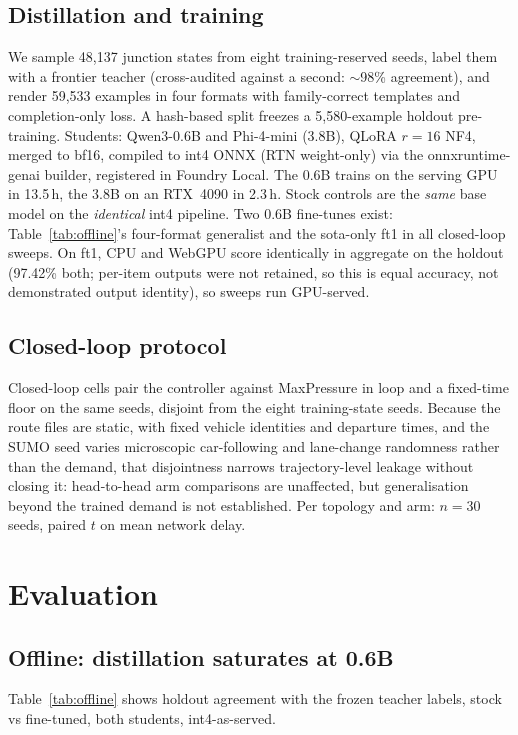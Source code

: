 \documentclass[conference]{IEEEtran}
\begin{document}
\subsection{Distillation and training}
We sample 48{,}137 junction states from eight training-reserved seeds, label
them with a frontier teacher (cross-audited against a second: $\sim$98\%
agreement), and render 59{,}533 examples in four formats with
family-correct templates and completion-only loss. A hash-based split
freezes a 5{,}580-example holdout pre-training. Students: Qwen3-0.6B and
Phi-4-mini (3.8B), QLoRA $r{=}16$ NF4, merged to bf16, compiled to int4 ONNX
(RTN weight-only) via the onnxruntime-genai builder, registered in Foundry
Local. The 0.6B trains on the serving GPU in 13.5\,h, the 3.8B on an
RTX~4090 in 2.3\,h. Stock controls are the \emph{same} base model on the
\emph{identical} int4 pipeline. Two 0.6B fine-tunes exist:
Table~\ref{tab:offline}'s four-format generalist and the sota-only ft1 in
all closed-loop sweeps. On ft1, CPU and WebGPU score identically in aggregate on the
holdout (97.42\% both; per-item outputs were not retained, so this is
equal accuracy, not demonstrated output identity), so sweeps run
GPU-served.

\subsection{Closed-loop protocol}
Closed-loop cells pair the controller against MaxPressure in loop and a
fixed-time floor on the same seeds, disjoint from the eight training-state
seeds. Because the route files are static, with fixed vehicle identities
and departure times, and the SUMO seed varies microscopic car-following and
lane-change randomness rather than the demand, that disjointness narrows
trajectory-level leakage without closing it: head-to-head arm comparisons
are unaffected, but generalisation beyond the trained demand is not
established. Per topology and arm: $n{=}30$ seeds, paired $t$ on mean network
delay.

\section{Evaluation}\label{sec:eval}

\subsection{Offline: distillation saturates at 0.6B}
Table~\ref{tab:offline} shows holdout agreement with the frozen teacher
labels, stock vs fine-tuned, both students, int4-as-served.
\end{document}
